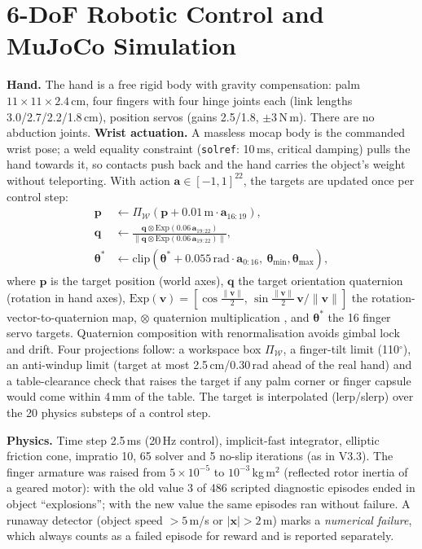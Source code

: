 \documentclass[conference,10pt]{IEEEtran}
\begin{document}
\section{6-DoF Robotic Control and MuJoCo Simulation}\label{sec:control}
\textbf{Hand.} The hand is a free rigid body with gravity compensation: palm $11\times11\times2.4$\,cm, four fingers with
four hinge joints each (link lengths 3.0/2.7/2.2/1.8\,cm), position servos (gains 2.5/1.8, $\pm3$\,N\,m). There are no
abduction joints. \textbf{Wrist actuation.} A massless mocap body is the commanded wrist pose; a weld equality constraint
(\texttt{solref}: 10\,ms, critical damping) pulls the hand towards it, so contacts push back and the hand carries the
object's weight without teleporting. With action $\bm a\in[-1,1]^{22}$, the targets are updated once per control step:
\begin{align}
\bm p &\leftarrow \Pi_{\mathcal W}\!\left(\bm p + 0.01\,\mathrm{m}\cdot \bm a_{16:19}\right),\label{eq:pos}\\
\bm q &\leftarrow \frac{\bm q\otimes \mathrm{Exp}(0.06\,\bm a_{19:22})}{\lVert \bm q\otimes \mathrm{Exp}(0.06\,\bm a_{19:22})\rVert},\label{eq:quat}\\
\bm\theta^{*} &\leftarrow \mathrm{clip}\!\left(\bm\theta^{*} + 0.055\,\mathrm{rad}\cdot\bm a_{0:16},\ \bm\theta_{\min},\bm\theta_{\max}\right),\label{eq:finger}
\end{align}
where $\bm p$ is the target position (world axes), $\bm q$ the target orientation quaternion (rotation in hand axes),
$\mathrm{Exp}(\bm v)=[\cos\frac{\lVert\bm v\rVert}{2},\,\sin\frac{\lVert\bm v\rVert}{2}\,\bm v/\lVert\bm v\rVert]$ the
rotation-vector-to-quaternion map, $\otimes$ quaternion multiplication \cite{shoemake1985}, and $\bm\theta^{*}$ the 16 finger servo targets.
Quaternion composition with renormalisation avoids gimbal lock and drift. Four projections follow: a workspace box
$\Pi_{\mathcal W}$, a finger-tilt limit (110$^\circ$), an anti-windup limit (target at most 2.5\,cm/0.30\,rad ahead of the
real hand) and a table-clearance check that raises the target if any palm corner or finger capsule would come within 4\,mm of
the table. The target is interpolated (lerp/slerp) over the 20 physics substeps of a control step.

\textbf{Physics.} Time step 2.5\,ms (20\,Hz control), implicit-fast integrator, elliptic friction cone, impratio 10, 65
solver and 5 no-slip iterations (as in V3.3). The finger armature was raised from $5\times10^{-5}$ to $10^{-3}$\,kg\,m$^2$
(reflected rotor inertia of a geared motor): with the old value 3 of 486 scripted diagnostic episodes ended in object
``explosions''; with the new value the same episodes ran without failure. A runaway detector (object speed $>5$\,m/s or
$|\bm x|>2$\,m) marks a \emph{numerical failure}, which always counts as a failed episode for reward and is reported separately.
\end{document}
